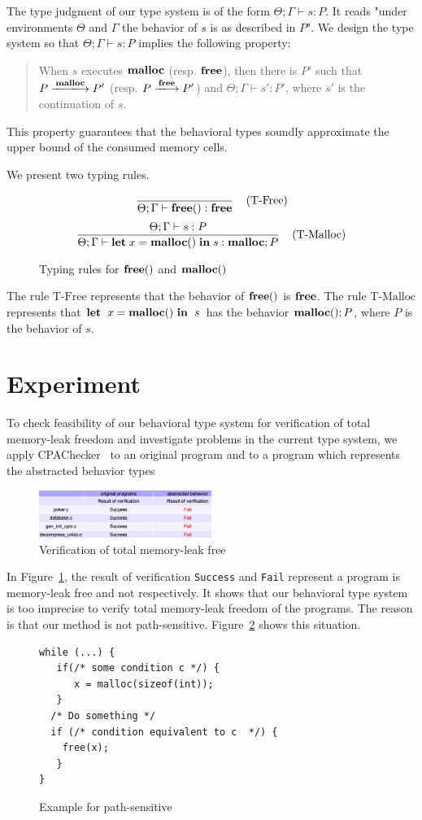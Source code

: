 \documentclass{sigplanconf}
\begin{document}
The type judgment of our type system is of the form $\Theta;\Gamma\vdash s :
P$.  It reads "under environments \(\Theta\) and  \(\Gamma\) the behavior
of \(s\) is as described in \(P\)".  We design the type system so that
\(\Theta;\Gamma \vdash s : P\) implies the following property:
\begin{quotation}
  When \(s\) executes \(\mathbf{malloc}\) (resp. \(\mathbf{free}\)), then there is
  \(P'\) such that \(P\xlongrightarrow{\Malloc} P'\)
  (resp. \(P\xlongrightarrow{\Free}P'\)) and \(\Theta;\Gamma \vdash s'
  : P'\), where \(s'\) is the continuation of \(s\).
\end{quotation}
This property guarantees that the behavioral types soundly
approximate the upper bound of the consumed memory cells.

We present two typing rules. 
\begin{figure}[t]
$$ \frac{}
{\Theta;\Gamma \vdash \mathbf{free}() : \mathbf{free}} 
\; \; \; \; \mbox{(T-Free)} $$
$$ \frac{\Theta;\Gamma \vdash s : P}
{\Theta;\Gamma \vdash \mathbf{let}\; x = \mathbf{malloc()} \; \mathbf{in}\; s  : \mathbf{malloc};P} 
\; \; \; \; \mbox{(T-Malloc)} $$
\caption{Typing rules for $\mathbf{free}()$ and $\mathbf{malloc()}$ }
\end{figure}
The rule $\mbox{T-Free}$ represents that the behavior of \(\mathbf{free}()\)
is \(\mathbf{free}\). The rule $\mbox{T-Malloc}$ represents that \(\mathbf{let}\;\ x =
\mathbf{malloc()}\ \mathbf{in}\;\ s\) has the behavior \(\mathbf{malloc()};P\), where \(P\) is the
behavior of \(s\).

\section{Experiment}
To check feasibility of our behavioral type system for verification of
total memory-leak freedom and investigate problems in the current type
system, we apply CPAChecker~\cite{beyer2011cpachecker} to an original
program and to a program which represents the abstracted behavior
types

\begin{figure}[!hbp]
\centering \includegraphics[width=0.5\textwidth]{exp.png}
\caption{Verification of total memory-leak free}
\label{figexp} 
\end{figure}

In Figure~\ref{figexp}, the result of verification \texttt{Success}
and \texttt{Fail} represent a program is memory-leak free and not
respectively. It shows that our behavioral type system is too
imprecise to verify total memory-leak freedom of the programs. The
reason is that our method is not path-sensitive. Figure~\ref{ex:fail}
shows this situation.
\begin{figure}[h]
\begin{verbatim}
while (...) {
   if(/* some condition c */) {
      x = malloc(sizeof(int));
   }
  /* Do something */
  if (/* condition equivalent to c  */) {
    free(x);
   }
}
\end{verbatim}
\caption{Example for path-sensitive}
\label{ex:fail}
\end{figure}
\end{document}
